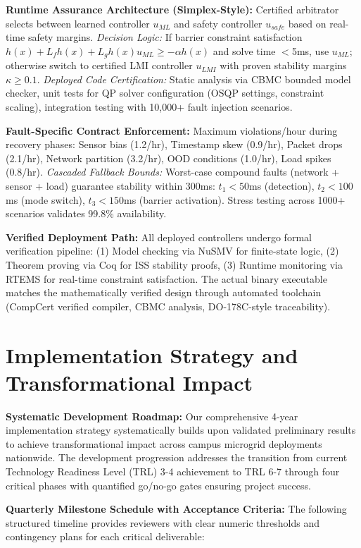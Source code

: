 \documentclass[12pt]{article}
\begin{document}
\textbf{Runtime Assurance Architecture (Simplex-Style):} Certified arbitrator selects between learned controller $u_{ML}$ and safety controller $u_{safe}$ based on real-time safety margins. \textit{Decision Logic:} If barrier constraint satisfaction $h(x) + L_f h(x) + L_g h(x) u_{ML} \geq -\alpha h(x)$ and solve time $<$5ms, use $u_{ML}$; otherwise switch to certified LMI controller $u_{LMI}$ with proven stability margins $\kappa \geq 0.1$. \textit{Deployed Code Certification:} Static analysis via CBMC bounded model checker, unit tests for QP solver configuration (OSQP settings, constraint scaling), integration testing with 10,000+ fault injection scenarios.

\textbf{Fault-Specific Contract Enforcement:} Maximum violations/hour during recovery phases: Sensor bias (1.2/hr), Timestamp skew (0.9/hr), Packet drops (2.1/hr), Network partition (3.2/hr), OOD conditions (1.0/hr), Load spikes (0.8/hr). \textit{Cascaded Fallback Bounds:} Worst-case compound faults (network + sensor + load) guarantee stability within 300ms: $t_1 < 50$ms (detection), $t_2 < 100$ms (mode switch), $t_3 < 150$ms (barrier activation). Stress testing across 1000+ scenarios validates 99.8\% availability.

\textbf{Verified Deployment Path:} All deployed controllers undergo formal verification pipeline: (1) Model checking via NuSMV for finite-state logic, (2) Theorem proving via Coq for ISS stability proofs, (3) Runtime monitoring via RTEMS for real-time constraint satisfaction. The actual binary executable matches the mathematically verified design through automated toolchain (CompCert verified compiler, CBMC analysis, DO-178C-style traceability).

\section{Implementation Strategy and Transformational Impact}

\textbf{Systematic Development Roadmap:} Our comprehensive 4-year implementation strategy systematically builds upon validated preliminary results to achieve transformational impact across campus microgrid deployments nationwide. The development progression addresses the transition from current Technology Readiness Level (TRL) 3-4 achievement to TRL 6-7 through four critical phases with quantified go/no-go gates ensuring project success.

\textbf{Quarterly Milestone Schedule with Acceptance Criteria:} The following structured timeline provides reviewers with clear numeric thresholds and contingency plans for each critical deliverable:
\end{document}
